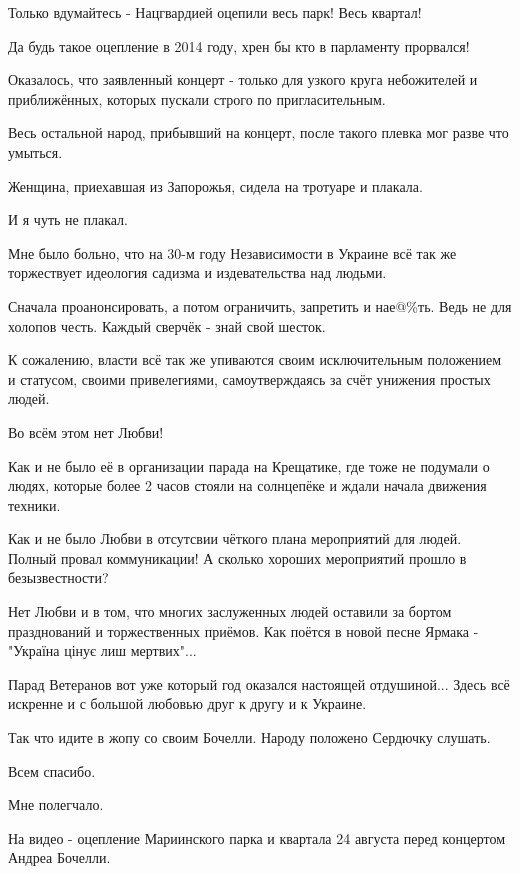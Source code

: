 Только вдумайтесь - Нацгвардией оцепили весь парк! Весь квартал! 

Да будь такое оцепление в 2014 году, хрен бы кто в парламенту прорвался!

Оказалось, что заявленный концерт - только для узкого круга небожителей и
приближённых, которых пускали строго по пригласительным. 

Весь остальной народ, прибывший на концерт, после такого плевка мог разве что
умыться. 

Женщина, приехавшая из Запорожья, сидела на тротуаре и плакала. 

И я чуть не плакал. 

Мне было больно, что на 30-м году Независимости в Украине всё так же
торжествует идеология садизма и издевательства над людьми. 

Сначала проанонсировать, а потом ограничить, запретить и нае@\%ть. Ведь не для
холопов честь. Каждый сверчёк - знай свой шесток. 

К сожалению, власти всё так же упиваются своим исключительным положением и
статусом, своими привелегиями, самоутверждаясь за счёт унижения простых людей. 

Во всём этом нет Любви! 

Как и не было её в организации парада на Крещатике, где тоже не подумали о
людях, которые более 2 часов стояли на солнцепёке и ждали начала движения
техники. 

Как и не было Любви в отсутсвии чёткого плана мероприятий для людей. Полный
провал коммуникации! А сколько хороших мероприятий прошло в безызвестности?  

Нет Любви и в том, что многих заслуженных людей оставили за бортом празднований
и торжественных приёмов. Как поётся в новой песне Ярмака - "Україна цінує лиш
мертвих"...

Парад Ветеранов вот уже который год оказался настоящей отдушиной... Здесь всё
искренне и с большой любовью друг к другу и к Украине. 

Так что идите в жопу со своим Бочелли. Народу положено Сердючку слушать. 

Всем спасибо. 

Мне полегчало. 

На видео - оцепление Мариинского парка и квартала 24 августа перед концертом
Андреа Бочелли.
